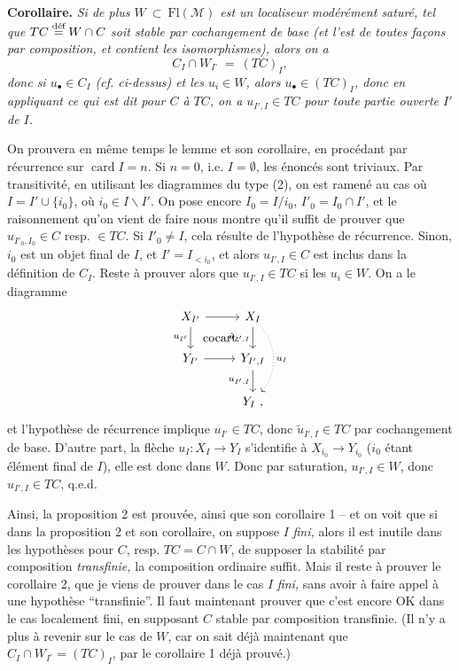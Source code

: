 \documentclass[11pt]{article}
\newcommand{\printedpage}[1]{\marginpar{\footnotesize p.~#1\ifstrequal{#1}{1}{\\[2pt]{[page 1]}}{}}}
\newcommand{\msp}[1]{\ifstrequal{#1}{page 1}{}{\marginpar{\footnotesize [#1]}}}
\newcommand{\cocart}{\textup{cocart.}}
\begin{document}
\textbf{Corollaire.} \textit{Si de plus $W \ \subset\ \mathrm{Fl}(\mathcal{M})$ est un localiseur modérément saturé, tel que $TC \overset{\textup{déf}}{=} W \cap C$ soit stable par cochangement de base (et l'est de toutes façons par composition, et contient les isomorphismes), alors on a}
\[
C_I \cap W_{I^\circ} \ = \ (TC)_I,
\]
\textit{donc si $u_\bullet \in C_I$ (cf. ci-dessus) et les $u_i \in W$, alors $u_\bullet \in (TC)_I$, donc en appliquant ce qui est dit pour $C$ à $TC$, on a $u_{I',I} \in TC$ pour toute} \msp{page 19} \textit{partie ouverte $I'$ de $I$.}

On prouvera en même temps le lemme et son corollaire, en procédant par récurrence sur $\operatorname{card} I = n$. Si $n = 0$, i.e. $I = \emptyset$, les énoncés sont triviaux. Par transitivité, en utilisant les diagrammes du type (2), on est ramené au cas où $I = I' \cup \{i_0\}$, où $i_0 \in I \backslash I'$. On pose encore $I_0 = I/i_0$, $I'_0 = I_0 \cap I'$, et le raisonnement qu'on vient de faire nous montre qu'il suffit de prouver que $u_{I'_0,I_0} \in C$ resp. $\in TC$. Si $I'_0 \neq I$, cela résulte de l'hypothèse de récurrence. %
Sinon, $i_0$ est un objet final de $I$, et $I' = I_{<i_0}$, et alors $u_{I',I} \in C$ est inclus dans la définition de $C_I$. Reste à prouver alors que $u_{I',I} \in TC$ si les $u_i \in W$. On a le diagramme
\printedpage{12}
\[
\begin{tikzcd}
X_{I'} \arrow[r] \arrow[d, "u_{I'}"'] \arrow[dr, phantom, "\cocart"] & X_I \arrow[d, "\tilde{u}_{I',I}"'] \arrow[dd, dotted, bend left=40, "u_I"] \\
Y_{I'} \arrow[r] & Y_{I',I} \arrow[d, "u_{I',I}"'] \\
 & Y_I\ ,
\end{tikzcd}
\]
\msp{page 20} et l'hypothèse de récurrence implique $u_{I'} \in TC$, donc $\tilde{u}_{I',I} \in TC$ par cochangement de base. D'autre part, la flèche $u_I : X_I \longrightarrow Y_I$ s'identifie à $X_{i_0} \longrightarrow Y_{i_0}$ ($i_0$ étant élément final de $I$), elle est donc dans $W$. Donc par saturation, $u_{I',I} \in W$, donc $u_{I',I} \in TC$, q.e.d.

Ainsi, la proposition 2 est prouvée, ainsi que son corollaire 1 -- et on voit que si dans la proposition 2 et son corollaire, on suppose $I$ \textit{fini,} alors il est inutile dans les hypothèses pour $C$, resp. $TC = C \cap W$, de supposer la stabilité par composition \textit{transfinie,} la composition ordinaire suffit. Mais il reste à prouver le corollaire 2, que je viens de prouver dans le cas $I$ \textit{fini,} sans avoir à faire appel à une hypothèse ``transfinie''. Il faut maintenant prouver que c'est encore OK dans le cas localement fini, en supposant $C$ stable par composition transfinie. (Il n'y a plus à revenir sur le cas de $W$, car on sait déjà maintenant que $C_I \cap W_{I^\circ} = (TC)_I$, par le corollaire 1 déjà prouvé.)
\end{document}
